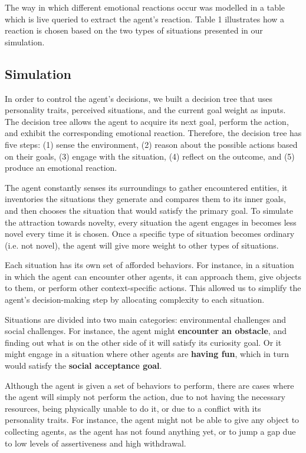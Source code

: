 The way in which different emotional reactions occur was modelled in a table which is live queried to extract the agent’s reaction. Table 1 illustrates how a reaction is chosen based on the two types of situations presented in our simulation.

\subsection{Simulation}

In order to control the agent’s decisions, we built a decision tree that uses personality traits, perceived situations, and the current goal weight as inputs. The decision tree allows the agent to acquire its next goal, perform the action, and exhibit the corresponding emotional reaction. Therefore, the decision tree has five steps: (1) sense the environment, (2) reason about the possible actions based on their goals, (3) engage with the situation, (4) reflect on the outcome, and (5) produce an emotional reaction.

The agent constantly senses its surroundings to gather encountered entities, it inventories the situations they generate and compares them to its inner goals, and then chooses the situation that would satisfy the primary goal. To simulate the attraction towards novelty, every situation the agent engages in becomes less novel every time it is chosen. Once a specific type of situation becomes ordinary (i.e. not novel), the agent will give more weight to other types of situations.

Each situation has its own set of afforded behaviors. For instance, in a situation in which the agent can encounter other agents, it can approach them, give objects to them, or perform other context-specific actions. This allowed us to simplify the agent’s decision-making step by allocating complexity to each situation.

Situations are divided into two main categories: environmental challenges and social challenges. For instance, the agent might \textbf{encounter an obstacle}, and finding out what is on the other side of it will satisfy its curiosity goal. Or it might engage in a situation where other agents are \textbf{having fun}, which in turn would satisfy the \textbf{social acceptance goal}.

Although the agent is given a set of behaviors to perform, there are cases where the agent will simply not perform the action, due to not having the necessary resources, being physically unable to do it, or due to a conflict with its personality traits. For instance, the agent might not be able to give any object to collecting agents, as the agent has not found anything yet, or to jump a gap due to low levels of assertiveness and high withdrawal.

